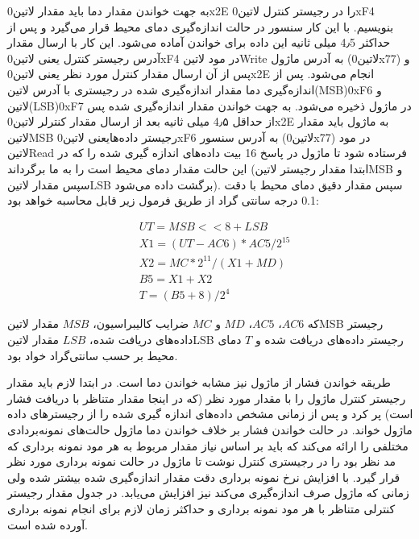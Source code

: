 به جهت خواندن مقدار دما باید مقدار ‌لاتین{0x2E} را در رجیستر کنترل ‌لاتین{0xF4} بنویسیم. با این کار سنسور در حالت اندازه‌گیری دمای محیط قرار می‌گیرد و پس از حداکثر 4٫5 میلی ثانیه این داده برای خواندن آماده ‌می‌شود. این کار با ارسال مقدار آدرس رجیستر کنترل یعنی ‌لاتین{0xF4} در مود ‌لاتین{Write} به آدرس ماژول (‌لاتین{0x77}) و پس از آن ارسال مقدار کنترل مورد نظر یعنی ‌لاتین{0x2E} انجام می‌شود. پس از اندازه‌گیری دما مقدار اندازه‌گیری شده در رجیستری با آدرس ‌لاتین{(MSB)0xF6} و ‌لاتین{(LSB)0xF7} در ماژول ذخیره می‌شود. به جهت خواندن مقدار اندازه‌گیری شده پس از حداقل 4٫۵ میلی ثانیه بعد از ارسال مقدار کنترلر ‌لاتین{0x2E} به ماژول باید مقدار ‌لاتین{MSB} رجیستر داده‌هایعنی ‌لاتین{0xF6} به آدرس سنسور (‌لاتین{0x77}) در مود ‌لاتین{Read} فرستاده شود تا ماژول در پاسخ 16 بیت داده‌های اندازه گیری شده را که در این حالت مقدار دمای محیط است را به ما برگرداند (ابتدا مقدار رجیستر ‌لاتین{MSB} و سپس مقدار ‌لاتین{LSB} برگشت داده می‌شود). سپس مقدار دقیق دمای محیط با دقت 0.1 درجه سانتی گراد از طریق فرمول زیر قابل محاسبه خواهد بود:
\begin{fleqn}
	\begin{equation*}
		\begin{split}
			&UT = MSB << 8 + LSB \\
			&X1 = (UT - AC6) * AC5 / 2^{15} \\
			&X2 = MC * 2^{11} / (X1 + MD) \\
			&B5 = X1 + X2 \\
			&T = (B5 + 8) / 2^4
		\end{split}
	\end{equation*}
\end{fleqn}
\noindent
که $AC6$، $AC5$، $MD$ و $MC$ ضرایب کالیبراسیون، $MSB$ مقدار ‌لاتین{MSB} رجیستر داده‌های دریافت شده، $LSB$ مقدار ‌لاتین{LSB} رجیستر داده‌های دریافت شده و $T$ دمای محیط بر حسب سانتی‌گراد خواد بود.

طریقه خواندن فشار از ماژول نیز مشابه خواندن دما است. در ابتدا لازم باید مقدار رجیستر کنترل ماژول را با مقدار مورد نظر (که در اینجا مقدار متناظر با دریافت فشار است) پر کرد و پس از زمانی مشخص داده‌های اندازه گیری شده را از رجیستر‌های داده ماژول خواند. در حالت خواندن فشار بر خلاف خواندن دما ماژول حالت‌های نمونه‌بردادی مختلفی را ارائه می‌کند که باید بر اساس نیاز مقدار مربوط به هر مود نمونه برداری که مد نظر بود را در رجیستری کنترل نوشت تا ماژول در حالت نمونه برداری مورد نظر قرار گیرد. با افزایش نرخ نمونه برداری دقت مقدار اندازه‌گیری شده بیشتر شده ولی زمانی که ماژول صرف اندازه‌گیری می‌کند نیز افزایش می‌یابد. در جدول  مقدار رجیستر کنترلی متناظر با هر مود نمونه برداری و حداکثر زمان لازم برای انجام نمونه برداری آورده شده است. 

